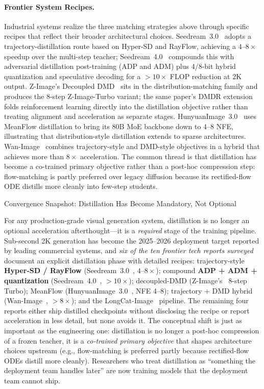 \paragraph{Frontier System Recipes.}
{Industrial systems realize the three matching strategies above through specific recipes that reflect their broader architectural choices. Seedream~3.0~\citep{gao2025seedream} adopts a trajectory-distillation route based on Hyper-SD and RayFlow, achieving a $4$--$8\times$ speedup over the multi-step teacher; Seedream~4.0~\citep{seedream2025seedream} compounds this with adversarial distillation post-training (ADP and ADM) plus 4/8-bit hybrid quantization and speculative decoding for a $>10\times$ FLOP reduction at 2K output. Z-Image's Decoupled DMD~\citep{cai2025z} sits in the distribution-matching family and produces the 8-step Z-Image-Turbo variant; the same paper's DMDR extension folds reinforcement learning directly into the distillation objective rather than treating alignment and acceleration as separate stages. HunyuanImage~3.0~\citep{cao2025hunyuanimage} uses MeanFlow distillation to bring its 80B MoE backbone down to 4--8 NFE, illustrating that distribution-style distillation extends to sparse architectures. Wan-Image~\citep{mao2026wan} combines trajectory-style and DMD-style objectives in a hybrid that achieves more than $8\times$ acceleration. The common thread is that distillation has become a co-trained primary objective rather than a post-hoc compression step: flow-matching is partly preferred over legacy diffusion because its rectified-flow ODE distills more cleanly into few-step students.}

\begin{highlightbox}{Convergence Snapshot: Distillation Has Become Mandatory, Not Optional}

For any production-grade visual generation system, distillation is no longer an optional acceleration afterthought---it is a \emph{required} stage of the training pipeline. Sub-second 2K generation has become the 2025--2026 deployment target reported by leading commercial systems, and \emph{six of the ten frontier tech reports surveyed} document an explicit distillation phase with detailed recipes: trajectory-style \textbf{Hyper-SD / RayFlow} (Seedream~3.0~\citep{gao2025seedream}, $4$--$8\times$); compound \textbf{ADP + ADM + quantization} (Seedream~4.0~\citep{seedream2025seedream}, $>10\times$); decoupled-DMD (Z-Image's~\citep{cai2025z} 8-step Turbo); MeanFlow (HunyuanImage~3.0~\citep{cao2025hunyuanimage}, NFE 4--8); trajectory + DMD hybrid (Wan-Image~\citep{mao2026wan}, $>8\times$); and the LongCat-Image~\citep{team2025longcat} pipeline. The remaining four reports either ship distilled checkpoints without disclosing the recipe or report acceleration in less detail, but none avoids it. The conceptual shift is just as important as the engineering one: distillation is no longer a post-hoc compression of a frozen teacher, it is a \emph{co-trained primary objective} that shapes architecture choices upstream (e.g., flow-matching is preferred partly because rectified-flow ODEs distill more cleanly). Researchers who treat distillation as ``something the deployment team handles later'' are now training models that the deployment team cannot ship.
\end{highlightbox}

